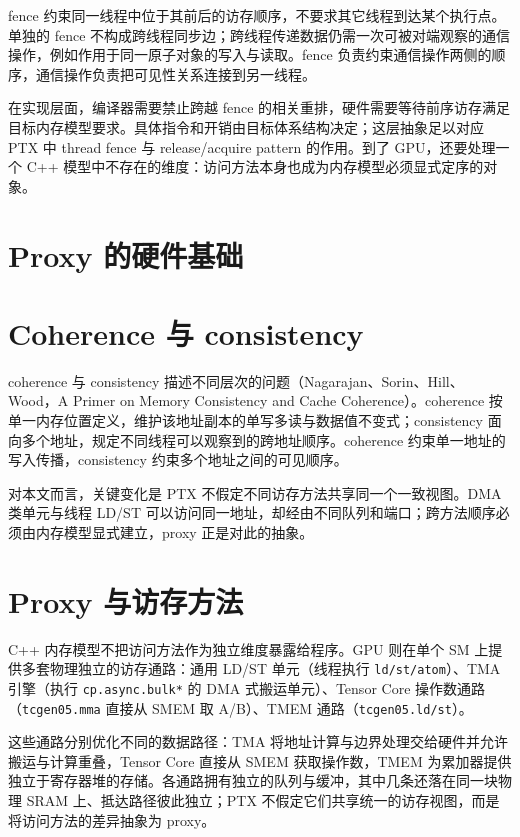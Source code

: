 fence 约束同一线程中位于其前后的访存顺序，不要求其它线程到达某个执行点。单独的 fence 不构成跨线程同步边；跨线程传递数据仍需一次可被对端观察的通信操作，例如作用于同一原子对象的写入与读取。fence 负责约束通信操作两侧的顺序，通信操作负责把可见性关系连接到另一线程。

在实现层面，编译器需要禁止跨越 fence 的相关重排，硬件需要等待前序访存满足目标内存模型要求。具体指令和开销由目标体系结构决定；这层抽象足以对应 PTX 中 thread fence 与 release/acquire pattern 的作用。到了 GPU，还要处理一个 C++ 模型中不存在的维度：访问方法本身也成为内存模型必须显式定序的对象。

\section{Proxy 的硬件基础}

\section{Coherence 与 consistency}

coherence 与 consistency 描述不同层次的问题（Nagarajan、Sorin、Hill、Wood，A Primer on Memory Consistency and Cache Coherence）。coherence 按单一内存位置定义，维护该地址副本的单写多读与数据值不变式；consistency 面向多个地址，规定不同线程可以观察到的跨地址顺序。coherence 约束单一地址的写入传播，consistency 约束多个地址之间的可见顺序。

对本文而言，关键变化是 PTX 不假定不同访存方法共享同一个一致视图。DMA 类单元与线程 LD/ST 可以访问同一地址，却经由不同队列和端口；跨方法顺序必须由内存模型显式建立，proxy 正是对此的抽象。

\section{Proxy 与访存方法}

C++ 内存模型不把访问方法作为独立维度暴露给程序。GPU 则在单个 SM 上提供多套物理独立的访存通路：通用 LD/ST 单元（线程执行 \lstinline|ld/st/atom|）、TMA 引擎（执行 \lstinline|cp.async.bulk*| 的 DMA 式搬运单元）、Tensor Core 操作数通路（\lstinline|tcgen05.mma| 直接从 SMEM 取 A/B）、TMEM 通路（\lstinline|tcgen05.ld/st|）。

这些通路分别优化不同的数据路径：TMA 将地址计算与边界处理交给硬件并允许搬运与计算重叠，Tensor Core 直接从 SMEM 获取操作数，TMEM 为累加器提供独立于寄存器堆的存储。各通路拥有独立的队列与缓冲，其中几条还落在同一块物理 SRAM 上、抵达路径彼此独立；PTX 不假定它们共享统一的访存视图，而是将访问方法的差异抽象为 proxy。


